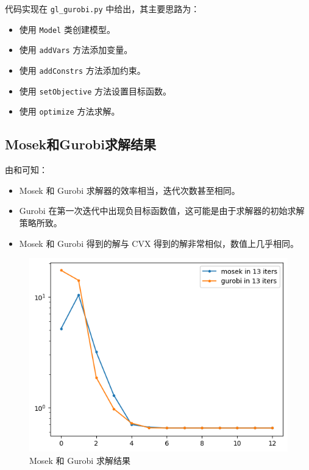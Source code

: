 \documentclass[journal, a4paper]{IEEEtran}
\begin{document}
代码实现在 \texttt{gl\_gurobi.py} 中给出，其主要思路为：
\begin{itemize}
    \item 使用 \texttt{Model} 类创建模型。
    \item 使用 \texttt{addVars} 方法添加变量。
    \item 使用 \texttt{addConstrs} 方法添加约束。
    \item 使用 \texttt{setObjective} 方法设置目标函数。
    \item 使用 \texttt{optimize} 方法求解。
\end{itemize}

\subsection{\textbf{Mosek和Gurobi求解结果}}

由和可知：

\begin{itemize}
    \item Mosek 和 Gurobi 求解器的效率相当，迭代次数甚至相同。
    \item Gurobi 在第一次迭代中出现负目标函数值，这可能是由于求解器的初始求解策略所致。
    \item Mosek 和 Gurobi 得到的解与 CVX 得到的解非常相似，数值上几乎相同。
\end{itemize}

\begin{figure}[H]
    \centering
    \includegraphics[width=0.8\columnwidth]{img/mosek-gurobi.png}
    {\centering \small \caption{Mosek 和 Gurobi 求解结果}\label{fig:MosekGurobi}}
    
\end{figure}
\end{document}
